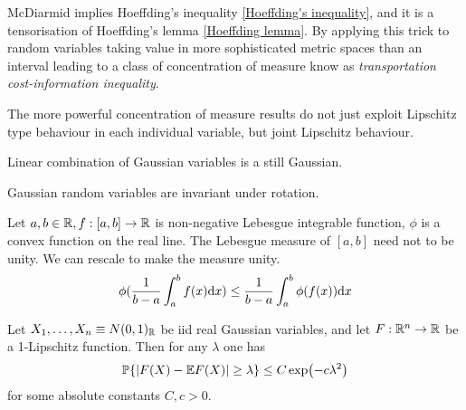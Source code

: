 McDiarmid implies Hoeffding's inequality \ref{Hoeffding's inequality}, and it is a tensorisation of Hoeffding's lemma \ref{Hoeffding lemma}. By applying this trick to random variables taking value in more sophisticated metric spaces than an interval leading to a class of concentration of measure know as \textit{transportation cost-information inequality}.

The more powerful concentration of measure results do not just exploit Lipschitz type behaviour in each individual variable, but joint Lipschitz behaviour. 

\begin{proposition}
    Linear combination of Gaussian variables is a still Gaussian.

    Gaussian random variables are invariant under rotation.
\end{proposition}

\begin{lemma}
    \label{Measure-theoretic Jensen's inequality}
    Let $a,b\in \mathbb{R},f:[a,b]\to \mathbb{R}$ is non-negative Lebesgue integrable function, $\phi$ is a convex function on the real line. The Lebesgue measure of $[a,b]$ need not to be unity. We can rescale to make the measure unity.
    \begin{equation*}
        \phi (\frac{1}{b-a}\int_a^b f(x) \mathrm{d} x) \leq \frac{1}{b-a} \int_a^b \phi(f(x))\mathrm{d} x
    \end{equation*}
\end{lemma}

\begin{theorem}
    \label{Gaussian concentration inequality for Lipschitz function}
    Let $X_1,\dots,X_n \equiv N(0,1)_{\mathbb{R}}$ be iid real Gaussian variables, and let $F:\mathbb{R}^n \to \mathbb{R} $ be a 1-Lipschitz function. Then for any $\lambda$ one has 
    \begin{equation*}
        \mathbb{P}\{|F(X)-\mathbb{E} F(X)|\geq \lambda \} \leq C\exp (-c\lambda^2)
    \end{equation*}
    for some absolute constants $C,c>0$.
\end{theorem}

